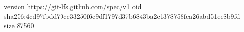 version https://git-lfs.github.com/spec/v1
oid sha256:4cd97fbdd79cc33250f6c9df1797d37b6843ba2c1378758fca26abd51ee8b9fd
size 87560
